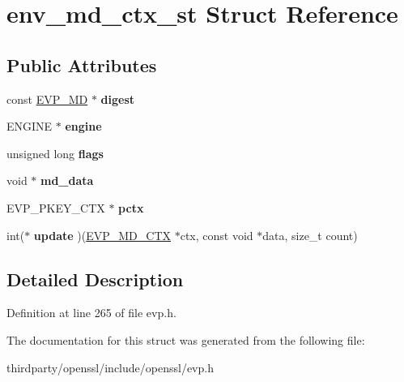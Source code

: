 \hypertarget{structenv__md__ctx__st}{}\section{env\+\_\+md\+\_\+ctx\+\_\+st Struct Reference}
\label{structenv__md__ctx__st}
\subsection*{Public Attributes}
\begin{DoxyCompactItemize}
\item 
\mbox{\label{structenv__md__ctx__st_a5cd23227051f7f605039f24f105f0dea}} 
const \hyperlink{structenv__md__st}{E\+V\+P\+\_\+\+MD} $\ast$ {\bfseries digest}
\item 
\mbox{\label{structenv__md__ctx__st_aa74b6022586da8be425ea8eb897a8130}} 
E\+N\+G\+I\+NE $\ast$ {\bfseries engine}
\item 
\mbox{\label{structenv__md__ctx__st_aae521b439879e6584b766d7703741d43}} 
unsigned long {\bfseries flags}
\item 
\mbox{\label{structenv__md__ctx__st_a9e1598967116d321673826a7909e7efa}} 
void $\ast$ {\bfseries md\+\_\+data}
\item 
\mbox{\label{structenv__md__ctx__st_aaf0d8bf6f34617159fd263074a07a555}} 
E\+V\+P\+\_\+\+P\+K\+E\+Y\+\_\+\+C\+TX $\ast$ {\bfseries pctx}
\item 
\mbox{\label{structenv__md__ctx__st_a55517be3f51260fe504e146b9b651d60}} 
int($\ast$ {\bfseries update} )(\hyperlink{structenv__md__ctx__st}{E\+V\+P\+\_\+\+M\+D\+\_\+\+C\+TX} $\ast$ctx, const void $\ast$data, size\+\_\+t count)
\end{DoxyCompactItemize}


\subsection{Detailed Description}


Definition at line 265 of file evp.\+h.



The documentation for this struct was generated from the following file\+:\begin{DoxyCompactItemize}
\item 
thirdparty/openssl/include/openssl/evp.\+h\end{DoxyCompactItemize}
